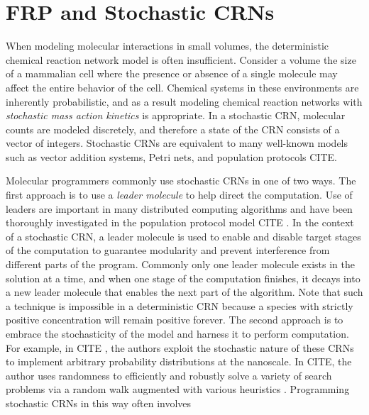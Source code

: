 
\section{FRP and Stochastic CRNs}
\label{sec:frp_scrns}

When modeling molecular interactions in small volumes, the deterministic chemical reaction network model is often insufficient.
Consider a volume the size of a mammalian cell where the presence or absence of a single molecule may affect the entire behavior of the cell.
Chemical systems in these environments are inherently probabilistic, and as a result modeling chemical reaction networks with \emph{stochastic mass action kinetics} is appropriate.
In a stochastic CRN, molecular counts are modeled discretely, and therefore a state of the CRN consists of a vector of integers.
Stochastic CRNs are equivalent to many well-known models such as vector addition systems, Petri nets, and population protocols CITE.

Molecular programmers commonly use stochastic CRNs in one of two ways.
The first approach is to use a \emph{leader molecule} to help direct the computation.
Use of leaders are important in many distributed computing algorithms and have been thoroughly investigated in the population protocol model CITE .
In the context of a stochastic CRN, a leader molecule is used to enable and disable target stages of the computation to guarantee modularity and prevent interference from different parts of the program.
Commonly only one leader molecule exists in the solution at a time, and when one stage of the computation finishes, it decays into a new leader molecule that enables the next part of the algorithm.
Note that such a technique is impossible in a deterministic CRN because a species with strictly positive concentration will remain positive forever.
The second approach is to embrace the stochasticity of the model and harness it to perform computation.
For example, in CITE , the authors exploit the stochastic nature of these CRNs to implement arbitrary probability distributions at the nanoscale.
In CITE, the author uses randomness to efficiently and robustly solve a variety of search problems via a random walk augmented with various heuristics .
Programming stochastic CRNs in this way often involves 


